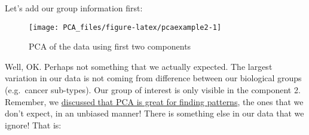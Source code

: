 \documentclass[
]{book}
\newenvironment{Shaded}{\begin{snugshade}}{\end{snugshade}}
\newcommand{\CommentTok}[1]{\textcolor[rgb]{0.56,0.35,0.01}{\textit{#1}}}
\newcommand{\DataTypeTok}[1]{\textcolor[rgb]{0.13,0.29,0.53}{#1}}
\newcommand{\DecValTok}[1]{\textcolor[rgb]{0.00,0.00,0.81}{#1}}
\newcommand{\FloatTok}[1]{\textcolor[rgb]{0.00,0.00,0.81}{#1}}
\newcommand{\KeywordTok}[1]{\textcolor[rgb]{0.13,0.29,0.53}{\textbf{#1}}}
\newcommand{\NormalTok}[1]{#1}
\newcommand{\OperatorTok}[1]{\textcolor[rgb]{0.81,0.36,0.00}{\textbf{#1}}}
\newcommand{\StringTok}[1]{\textcolor[rgb]{0.31,0.60,0.02}{#1}}
\theoremstyle{definition}
\theoremstyle{definition}
\theoremstyle{definition}
\theoremstyle{remark}
\begin{document}
Let's add our group information first:

\begin{Shaded}
\end{Shaded}

\begin{figure}

{\centering \texttt{[image: PCA\_files/figure-latex/pcaexample2-1]} 

}

\caption{PCA of the data using first two components}\label{fig:pcaexample2}
\end{figure}

Well, OK. Perhaps not something that we actually expected. The largest variation in our data is not coming from difference between our biological groups (e.g.~cancer sub-types). Our group of interest is only visible in the component 2. Remember, we \protect\hyperlink{pcamot}{discussed that PCA is great for finding patterns}, the ones that we don't expect, in an unbiased manner! There is something else in our data that we ignore! That is:
\end{document}
